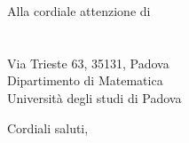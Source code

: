 \documentclass[a4paper]{letter}
\begin{document}
\begin{letter} {Alla cordiale attenzione di \\ \TV \\ \RC \\ Via Trieste 63, 35131, Padova\\ Dipartimento di Matematica \\ Università degli studi di Padova }
\closing{
  Cordiali saluti,
}

\end{letter}
\end{document}
